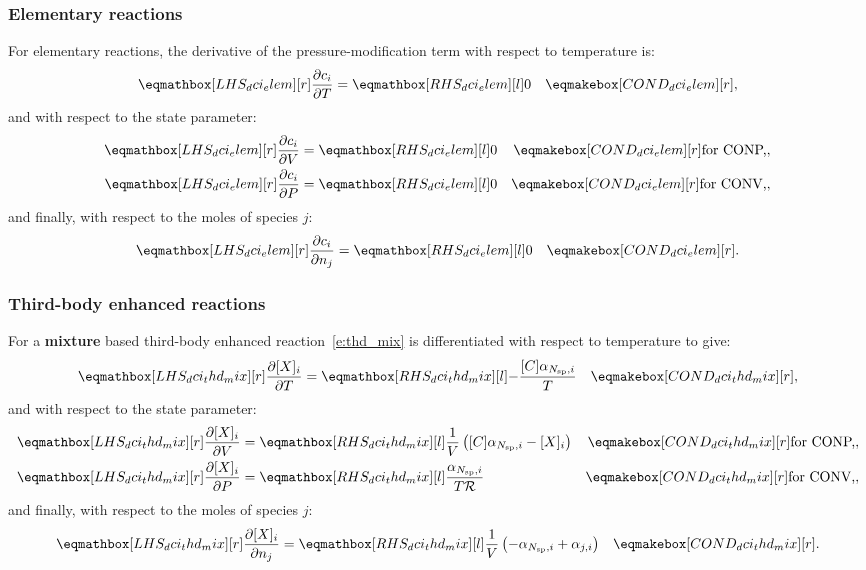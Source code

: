 \documentclass[12pt,number,sort&compress]{elsarticle}
\begin{document}
\subsubsection{Elementary reactions}
For elementary reactions, the derivative of the pressure-modification term with respect to temperature is:
\begin{align}
\lhs{dci_elem}{\frac{\partial c_{i} }{\partial T }} &= \rhs{dci_elem}{0} & \cond{dci_elem}{,} \label{e:dci_elem_dt}
\end{align}
and with respect to the state parameter:
\begin{subequations}
 \label{e:dci_elem_de}
 \begin{align}
  \lhs{dci_elem}{\frac{\partial c_{i} }{\partial V }} &= \rhs{dci_elem}{0} & \cond{dci_elem}{\dconp/,} \\
  \lhs{dci_elem}{\frac{\partial c_{i} }{\partial P }} &= \rhs{dci_elem}{0} & \cond{dci_elem}{\dconv/,}
 \end{align}
\end{subequations}
and finally, with respect to the moles of species $j$:
\begin{align}
 \lhs{dci_elem}{\frac{\partial c_{i} }{\partial {n_j} }} &= \rhs{dci_elem}{0} & \cond{dci_elem}{.} \label{e:dci_elem_dnj}
\end{align}


\subsubsection{Third-body enhanced reactions}
\label{s:dci_thd}
For a \textbf{mixture} based third-body enhanced reaction~\cref{e:thd_mix} is differentiated with respect to temperature to give:
\begin{align}
 \label{e:dci_thd_dt}
 \lhs{dci_thd_mix}{\frac{\partial [X]_i }{\partial T }} &= \rhs{dci_thd_mix}{-\frac{[C] \alpha_{\ns/,i}}{T}} & \cond{dci_thd_mix}{,}
\end{align}
and with respect to the state parameter:
\begin{subequations}
 \label{e:dci_thd_de}
 \begin{align}
 \lhs{dci_thd_mix}{\frac{\partial [X]_i }{\partial V }} &= \rhs{dci_thd_mix}{\frac{1}{V} \left([C] \alpha_{\ns/,i} - [X]_{i}\right)} & \cond{dci_thd_mix}{\dconp/,}\\
 \lhs{dci_thd_mix}{\frac{\partial [X]_i }{\partial P }} &= \rhs{dci_thd_mix}{\frac{\alpha_{\ns/,i}}{T \Ru/}} & \cond{dci_thd_mix}{\dconv/,}
 \end{align}
\end{subequations}
and finally, with respect to the moles of species $j$:
\begin{align}
\label{e:dci_thd_dnj}
\lhs{dci_thd_mix}{\frac{\partial [X]_i }{\partial n_{j}}} &= \rhs{dci_thd_mix}{\frac{1}{V} \left(- \alpha_{\ns/,i} + \alpha_{j,i}\right)} & \cond{dci_thd_mix}{.}
\end{align}
\end{document}
